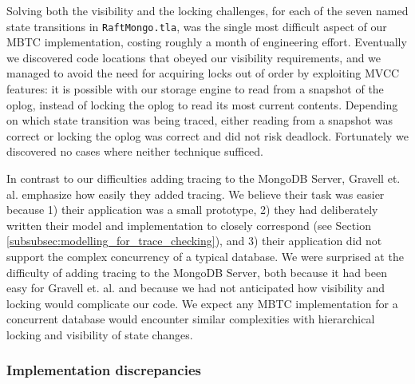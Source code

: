 \documentclass{vldb}
\begin{document}
Solving both the visibility and the locking challenges, for each of the seven named state transitions in \texttt{RaftMongo.tla}, was the single most difficult aspect of our MBTC implementation, costing roughly a month of engineering effort. 
Eventually we discovered code locations that obeyed our visibility requirements, and we managed to avoid the need for acquiring locks out of order by exploiting MVCC features: it is possible with our storage engine to read from a snapshot of the oplog, instead of locking the oplog to read its most current contents.
Depending on which state transition was being traced, either reading from a snapshot was correct or locking the oplog was correct and did not risk deadlock.
Fortunately we discovered no cases where neither technique sufficed.


In contrast to our difficulties adding tracing to the MongoDB Server, Gravell et. al. \cite{Gravell11ConcurrentDevelopmentOfModelAndImplementation} emphasize how easily they added tracing.
We believe their task was easier because 1) their application was a small prototype, 2) they had deliberately written their model and implementation to closely correspond (see Section \ref{subsubsec:modelling_for_trace_checking}), and 3) their application did not support the complex concurrency of a typical database.
We were surprised at the difficulty of adding tracing to the MongoDB Server, both because it had been easy for Gravell et. al. and because we had not anticipated how visibility and locking would complicate our code.
We expect any MBTC implementation for a concurrent database would encounter similar complexities with hierarchical locking and visibility of state changes.

\subsubsection{Implementation discrepancies}
\label{subsubsec:mbtc_impl_discrepencies}
\end{document}
